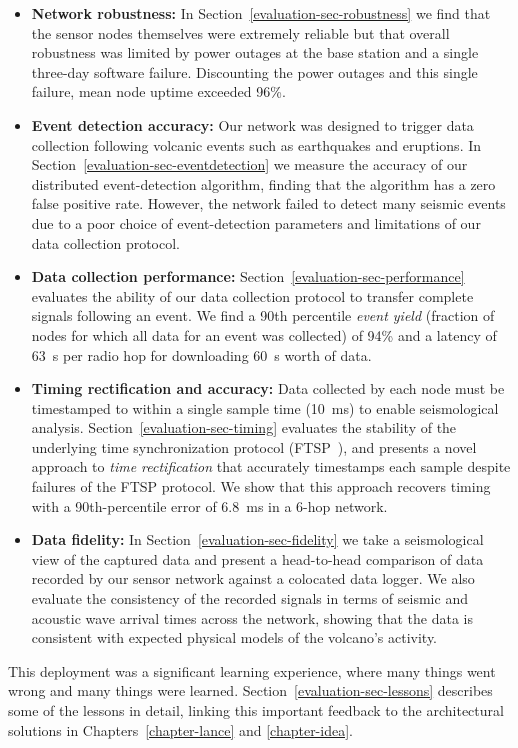 \begin{itemize}

\item \textbf{Network robustness:} In Section~\ref{evaluation-sec-robustness}
we find that the sensor nodes themselves were extremely reliable but that
overall robustness was limited by power outages at the base station and a
single three-day software failure. Discounting the power outages and this
single failure, mean node uptime exceeded 96\%.

\item \textbf{Event detection accuracy:} Our network was designed to trigger
data collection following volcanic events such as earthquakes and eruptions.
In Section~\ref{evaluation-sec-eventdetection} we measure the accuracy of our
distributed event-detection algorithm, finding that the algorithm has a zero
false positive rate. However, the network failed to detect many seismic
events due to a poor choice of event-detection parameters and limitations of
our data collection protocol.

\item \textbf{Data collection performance:}
Section~\ref{evaluation-sec-performance} evaluates the ability of our data
collection protocol to transfer complete signals following an event. We find
a 90th percentile \textit{event yield} (fraction of nodes for which all data
for an event was collected) of 94\% and a latency of 63~s per radio hop for
downloading 60~s worth of data.

\item \textbf{Timing rectification and accuracy:} Data collected by each node
must be timestamped to within a single sample time (10~ms) to enable
seismological analysis. Section~\ref{evaluation-sec-timing} evaluates the
stability of the underlying time synchronization protocol (FTSP~\cite{ftsp}),
and presents a novel approach to \textit{time rectification} that accurately
timestamps each sample despite failures of the FTSP protocol. We show that
this approach recovers timing with a 90th-percentile error of 6.8~ms in a
6-hop network.

\item \textbf{Data fidelity:} In Section~\ref{evaluation-sec-fidelity} we
take a seismological view of the captured data and present a head-to-head
comparison of data recorded by our sensor network against a colocated data
logger. We also evaluate the consistency of the recorded signals in terms of
seismic and acoustic wave arrival times across the network, showing that the
data is consistent with expected physical models of the volcano's activity.

\end{itemize}

This deployment was a significant learning experience, where many things went
wrong and many things were learned. Section~\ref{evaluation-sec-lessons}
describes some of the lessons in detail, linking this important feedback to
the architectural solutions in Chapters~\ref{chapter-lance} and
\ref{chapter-idea}.
